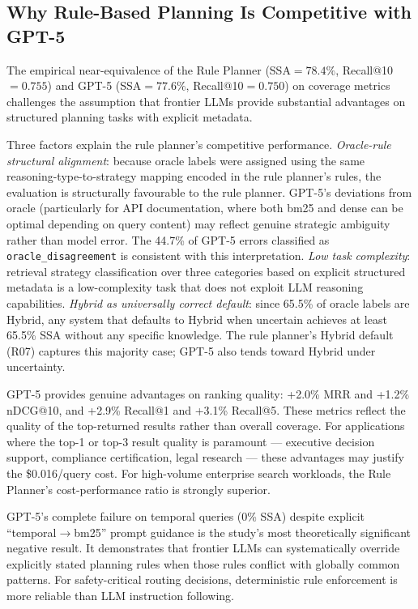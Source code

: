 \documentclass[11pt, a4paper]{article}
\begin{document}
\subsection{Why Rule-Based Planning Is Competitive with GPT-5}

The empirical near-equivalence of the Rule Planner (SSA$={78.4\%}$, Recall@10$={0.755}$) and GPT-5 (SSA$={77.6\%}$, Recall@10$={0.750}$) on coverage metrics challenges the assumption that frontier LLMs provide substantial advantages on structured planning tasks with explicit metadata.

Three factors explain the rule planner's competitive performance. \textit{Oracle-rule structural alignment}: because oracle labels were assigned using the same reasoning-type-to-strategy mapping encoded in the rule planner's rules, the evaluation is structurally favourable to the rule planner. GPT-5's deviations from oracle (particularly for API documentation, where both bm25 and dense can be optimal depending on query content) may reflect genuine strategic ambiguity rather than model error. The 44.7\% of GPT-5 errors classified as \texttt{oracle\_disagreement} is consistent with this interpretation. \textit{Low task complexity}: retrieval strategy classification over three categories based on explicit structured metadata is a low-complexity task that does not exploit LLM reasoning capabilities. \textit{Hybrid as universally correct default}: since 65.5\% of oracle labels are Hybrid, any system that defaults to Hybrid when uncertain achieves at least 65.5\% SSA without any specific knowledge. The rule planner's Hybrid default (R07) captures this majority case; GPT-5 also tends toward Hybrid under uncertainty.

GPT-5 provides genuine advantages on ranking quality: +2.0\% MRR and +1.2\% nDCG@10, and +2.9\% Recall@1 and +3.1\% Recall@5. These metrics reflect the quality of the top-returned results rather than overall coverage. For applications where the top-1 or top-3 result quality is paramount --- executive decision support, compliance certification, legal research --- these advantages may justify the \$0.016/query cost. For high-volume enterprise search workloads, the Rule Planner's cost-performance ratio is strongly superior.

GPT-5's complete failure on temporal queries (0\% SSA) despite explicit ``temporal$\to$bm25'' prompt guidance is the study's most theoretically significant negative result. It demonstrates that frontier LLMs can systematically override explicitly stated planning rules when those rules conflict with globally common patterns. For safety-critical routing decisions, deterministic rule enforcement is more reliable than LLM instruction following.
\end{document}
